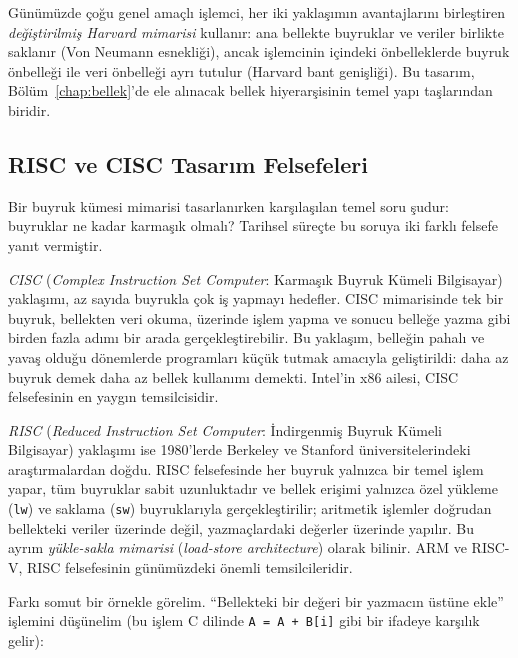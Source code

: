 Günümüzde çoğu genel amaçlı işlemci, her iki yaklaşımın avantajlarını birleştiren \emph{değiştirilmiş Harvard mimarisi} kullanır: ana bellekte buyruklar ve veriler birlikte saklanır (Von Neumann esnekliği), ancak işlemcinin içindeki önbelleklerde buyruk önbelleği ile veri önbelleği ayrı tutulur (Harvard bant genişliği). Bu tasarım, Bölüm~\ref{chap:bellek}'de ele alınacak bellek hiyerarşisinin temel yapı taşlarından biridir.

\subsection{RISC ve CISC Tasarım Felsefeleri}
\label{subsec:risc-cisc}

Bir buyruk kümesi mimarisi tasarlanırken karşılaşılan temel soru şudur: buyruklar ne kadar karmaşık olmalı? Tarihsel süreçte bu soruya iki farklı felsefe yanıt vermiştir.

\emph{CISC} (\emph{Complex Instruction Set Computer}: Karmaşık Buyruk Kümeli Bilgisayar) yaklaşımı, az sayıda buyrukla çok iş yapmayı hedefler. CISC mimarisinde tek bir buyruk, bellekten veri okuma, üzerinde işlem yapma ve sonucu belleğe yazma gibi birden fazla adımı bir arada gerçekleştirebilir. Bu yaklaşım, belleğin pahalı ve yavaş olduğu dönemlerde programları küçük tutmak amacıyla geliştirildi: daha az buyruk demek daha az bellek kullanımı demekti. Intel'in x86 ailesi, CISC felsefesinin en yaygın temsilcisidir.

\emph{RISC} (\emph{Reduced Instruction Set Computer}: İndirgenmiş Buyruk Kümeli Bilgisayar) yaklaşımı ise 1980'lerde Berkeley ve Stanford üniversitelerindeki araştırmalardan doğdu. RISC felsefesinde her buyruk yalnızca bir temel işlem yapar, tüm buyruklar sabit uzunluktadır ve bellek erişimi yalnızca özel yükleme (\texttt{lw}) ve saklama (\texttt{sw}) buyruklarıyla gerçekleştirilir; aritmetik işlemler doğrudan bellekteki veriler üzerinde değil, yazmaçlardaki değerler üzerinde yapılır. Bu ayrım \emph{yükle-sakla mimarisi} (\emph{load-store architecture}) olarak bilinir. ARM ve RISC-V, RISC felsefesinin günümüzdeki önemli temsilcileridir.

Farkı somut bir örnekle görelim. ``Bellekteki bir değeri bir yazmacın üstüne ekle'' işlemini düşünelim (bu işlem C dilinde \texttt{A = A + B[i]} gibi bir ifadeye karşılık gelir):

